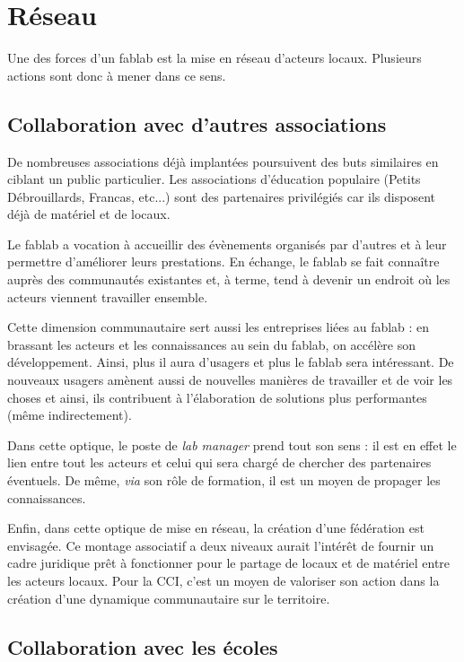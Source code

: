 \section{Réseau}

Une des forces d'un fablab est la mise en réseau d'acteurs locaux.
Plusieurs actions sont donc à mener dans ce sens.

\subsection{Collaboration avec d'autres associations}

De nombreuses associations déjà implantées poursuivent des buts similaires en ciblant un public particulier.
Les associations d'éducation populaire (Petits Débrouillards, Francas, etc...) sont des partenaires privilégiés car ils
disposent déjà de matériel et de locaux.

Le fablab a vocation à accueillir des évènements organisés par d'autres et à leur permettre d'améliorer leurs
prestations. En échange, le fablab se fait connaître auprès des communautés existantes et, à terme, tend à devenir un
endroit où les acteurs viennent travailler ensemble.

Cette dimension communautaire sert aussi les entreprises liées au fablab : en brassant les acteurs et les connaissances
au sein du fablab, on accélère son développement. Ainsi, plus il aura d'usagers et plus le fablab sera intéressant. De
nouveaux usagers amènent aussi de nouvelles manières de travailler et de voir les choses et ainsi, ils contribuent à
l'élaboration de solutions plus performantes (même indirectement).

Dans cette optique, le poste de \textit{lab manager} prend tout son sens : il est en effet le lien entre tout les acteurs et
celui qui sera chargé de chercher des partenaires éventuels. De même, \textit{via} son rôle de formation, il est un moyen de
propager les connaissances.

Enfin, dans cette optique de mise en réseau, la création d'une fédération est envisagée. Ce montage associatif a deux
niveaux aurait l'intérêt de fournir un cadre juridique prêt à fonctionner pour le partage de locaux et de matériel entre
les acteurs locaux. Pour la CCI, c'est un moyen de valoriser son action dans la création d'une dynamique communautaire
sur le territoire.

\subsection{Collaboration avec les écoles}

